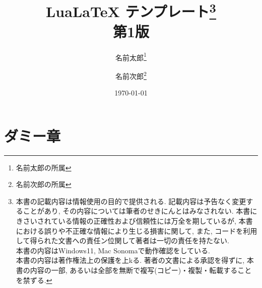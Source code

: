\documentclass[11pt,a4paper, titlepage]{ltjsbook}
\newcommand{\記}{\begin{center} 記 \end{center}}
\newcommand{\挨拶}{\noindent 拝啓 \ifcase\month\or 厳寒\or 春寒\or 早春
    \or 陽寒\or 新緑\or 向暑\or 猛暑\or 残暑\or 初秋\or 仲秋\or 晩秋\or 初冬
    \fi の候, ますますご清栄のこととお喜び申し上げます.}
\begin{document}
\title{Lua\LaTeX{} テンプレート\footnote{本書の記載内容は情報使用の目的で提供される. 記載内容は予告なく変更することがあり, その内容については筆者のせきにんとはみなされない. 本書にきさいされている情報の正確性および信頼性には万全を期しているが, 本書における誤りや不正確な情報により生じる損害に関して, また,
        コードを利用して得られた文書への責任ン位関して著者は一切の責任を持たない.
        \\本書の内容はWindows11, Mac Sonomaで動作確認をしている.
        \\本書の内容は著作権法上の保護を上kる. 著者の文書による承認を得ずに,
        本書の内容の一部, あるいは全部を無断で複写(コピー)・複製・転載することを禁ずる.}
    \\第1版}
\author{名前太郎\thanks{名前太郎の所属} \and 名前次郎\thanks{名前次郎の所属}}
\date{\today}
\maketitle

\begin{abstract}
    \lipsum[1-10]
\end{abstract}

\tableofcontents
\listoffigures
\listoftables
\newpage
\chapter{ダミー章}
\lipsum[1-5]
\end{document}
